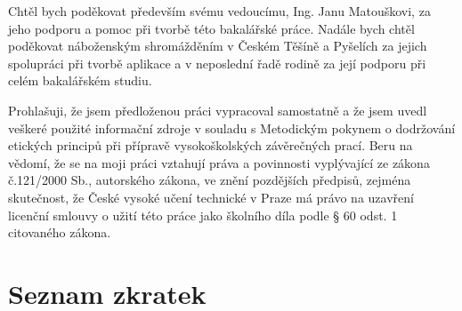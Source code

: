 \documentclass[czech,bachelor,unicode]{ctufit-thesis}
\begin{document}
 
\frontmatter\frontmatterinit



\thispagestyle{empty}\cleardoublepage\maketitle
\imprintpage
\tableofcontents

\listoffigures %
\begingroup
\let\clearpage\relax
\listoftables %
\listoflistings %
\endgroup

\begin{acknowledgmentpage}
	Chtěl bych poděkovat především svému vedoucímu, Ing. Janu Matouškovi, za jeho podporu a pomoc při tvorbě této bakalářské práce. Nadále bych chtěl poděkovat náboženským shromážděním v Českém Těšíně a Pyšelích za jejich spolupráci při tvorbě aplikace a v neposlední řadě rodině za její podporu při celém bakalářském studiu.
\end{acknowledgmentpage} 

\begin{declarationpage}
Prohlašuji, že jsem předloženou práci vypracoval samostatně a že jsem uvedl veškeré použité informační zdroje v souladu s Metodickým pokynem o dodržování etických principů při přípravě vysokoškolských závěrečných prací.
Beru na vědomí, že se na moji práci vztahují práva a povinnosti vyplývající ze zákona č.121/2000 Sb., autorského zákona, ve znění pozdějších předpisů, zejména skutečnost, že České vysoké učení technické v Praze má právo na uzavření licenční smlouvy o užití této práce jako školního díla podle § 60 odst. 1 citovaného zákona.
\end{declarationpage}

\printabstractpage

\chapter{Seznam zkratek}
	
\end{document}
